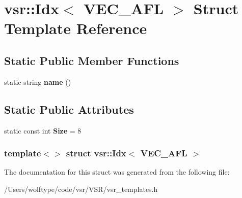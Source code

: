 \hypertarget{structvsr_1_1_idx_3_01_v_e_c___a_f_l_01_4}{\section{vsr\-:\-:Idx$<$ V\-E\-C\-\_\-\-A\-F\-L $>$ Struct Template Reference}
\label{structvsr_1_1_idx_3_01_v_e_c___a_f_l_01_4}
}
\subsection*{Static Public Member Functions}
\begin{DoxyCompactItemize}
\item 
\hypertarget{structvsr_1_1_idx_3_01_v_e_c___a_f_l_01_4_af7efd448e762dee373679b2391c28f1c}{static string {\bfseries name} ()}\label{structvsr_1_1_idx_3_01_v_e_c___a_f_l_01_4_af7efd448e762dee373679b2391c28f1c}

\end{DoxyCompactItemize}
\subsection*{Static Public Attributes}
\begin{DoxyCompactItemize}
\item 
\hypertarget{structvsr_1_1_idx_3_01_v_e_c___a_f_l_01_4_ad1c757d7236c67c60ea0dd75b6d4641d}{static const int {\bfseries Size} = 8}\label{structvsr_1_1_idx_3_01_v_e_c___a_f_l_01_4_ad1c757d7236c67c60ea0dd75b6d4641d}

\end{DoxyCompactItemize}
\subsubsection*{template$<$$>$ struct vsr\-::\-Idx$<$ V\-E\-C\-\_\-\-A\-F\-L $>$}



The documentation for this struct was generated from the following file\-:\begin{DoxyCompactItemize}
\item 
/\-Users/wolftype/code/vsr/\-V\-S\-R/vsr\-\_\-templates.\-h\end{DoxyCompactItemize}
